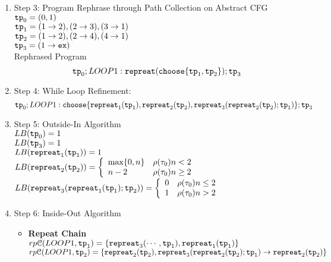 \begin{example}
\begin{enumerate}
    \item Step 3: Program Rephrase through Path Collection on Abstract CFG
    \\
    $\mathtt{tp}_0 = (0, 1)$
    \\
    $\mathtt{tp}_1 = (1 \to 2), (2 \to 3), (3 \to 1)$
    \\
    $\mathtt{tp}_2 = (1 \to 2), (2 \to 4), (4 \to 1)$
    \\
    $\mathtt{tp}_3 = (1 \to \mathtt{ex})$
    \\
    Rephrased Program
    \[
    \mathtt{tp}_0 ; LOOP1: \mathtt{repreat}(\mathtt{choose}\{\mathtt{tp}_1, \mathtt{tp}_2 \}); \mathtt{tp}_3
    \]
    \item Step 4: While Loop Refinement:
    \[
      \mathtt{tp}_0 ; 
      LOOP1: \mathtt{choose}\{\mathtt{repreat}_1(\mathtt{tp}_1), \mathtt{repreat}_2(\mathtt{tp}_2),
      \mathtt{repreat}_3(\mathtt{repreat}_2(\mathtt{tp}_2); \mathtt{tp}_1)\}; \mathtt{tp}_3
      \]
    \item Step 5: Outside-In Algorithm
    \\
    $LB(\mathtt{tp}_0) = 1$
    \\
    $LB(\mathtt{tp}_3) = 1$
    \\
    $LB(\mathtt{repreat}_1(\mathtt{tp}_1)) = 1 $
    \\
    $LB(\rprepeat_2(\tpath_2)) = 
    \left\{
      \begin{array}{ll}
      \max\{0, n\} & \env(\trace_0) n < 2 \\
      n - 2 & \env(\trace_0)  n \geq 2
      \end{array} 
    \right.$
    \\
    $LB(\rprepeat_3(\rprepeat_1(\tpath_1); \tpath_2)) = 
    \left\{
      \begin{array}{ll}
      0 & \env(\trace_0) n \leq 2 \\
      1 & \env(\trace_0)  n > 2
      \end{array} 
    \right.$
    \\
    \item Step 6: Inside-Out Algorithm
    \begin{itemize}
      \item \textbf{Repeat Chain}
      \\
      $rp\mathcal{C}(LOOP1, \mathtt{tp}_1) = \{\mathtt{repreat}_3(\cdots, \mathtt{tp}_1), \mathtt{repreat}_1(\mathtt{tp}_1)\}$ 
      \\
      $rp\mathcal{C}(LOOP1, \mathtt{tp}_2) = \{\mathtt{repreat}_2(\mathtt{tp}_2), \mathtt{repreat}_3(\mathtt{repreat}_2(\mathtt{tp}_2); \mathtt{tp}_1) \to \mathtt{repreat}_2(\mathtt{tp}_2)\}$ \\

\end{itemize}
\end{enumerate}
\end{example}
